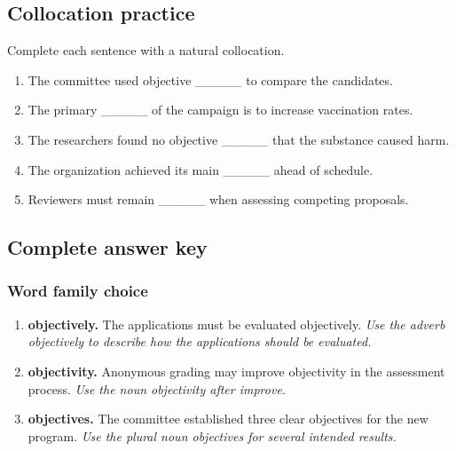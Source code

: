 \documentclass[11pt]{article}
\begin{document}
\subsection{Collocation practice}
Complete each sentence with a natural collocation.

\begin{enumerate}
  \item The committee used objective \_\_\_\_\_ to compare the candidates.
  \item The primary \_\_\_\_\_ of the campaign is to increase vaccination rates.
  \item The researchers found no objective \_\_\_\_\_ that the substance caused harm.
  \item The organization achieved its main \_\_\_\_\_ ahead of schedule.
  \item Reviewers must remain \_\_\_\_\_ when assessing competing proposals.
\end{enumerate}

\subsection{Complete answer key}
\subsubsection{Word family choice}
\begin{enumerate}
  \item \textbf{objectively.} The applications must be evaluated objectively. \emph{Use the adverb objectively to describe how the applications should be evaluated.}
  \item \textbf{objectivity.} Anonymous grading may improve objectivity in the assessment process. \emph{Use the noun objectivity after improve.}
  \item \textbf{objectives.} The committee established three clear objectives for the new program. \emph{Use the plural noun objectives for several intended results.}
\end{enumerate}
\end{document}

